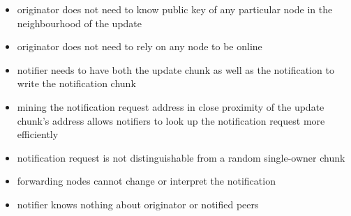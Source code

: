 \begin{itemize}
    \item originator does not need to know public key of any particular node in the neighbourhood of the update
    \item originator does not need to rely on any node to be online
    \item notifier needs to have both the update chunk as well as the notification to write the notification chunk
    \item mining the notification request address in close proximity of the update chunk's address allows notifiers to look up the notification request more efficiently
    \item notification request is not distinguishable from a random single-owner chunk
    \item forwarding nodes cannot change or interpret the notification 
    \item notifier knows nothing about originator or notified peers
\end{itemize}

